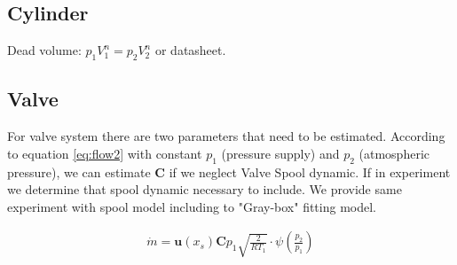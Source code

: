 \documentclass[class=article, crop=false]{standalone}
\begin{document}
\subsection{Cylinder}
Dead volume: $p_1 V_1^n = p_2 V_2^n$ or datasheet.

\subsection{Valve}
For valve system there are two parameters that need to be estimated.
According to equation \ref{eq:flow2} with constant $p_1$ (pressure supply) and $p_2$
(atmospheric pressure), we can estimate $\boldsymbol{C}$ if we neglect Valve Spool dynamic.
If in experiment we determine that spool dynamic necessary to include. We
provide same experiment with spool model including to "Gray-box" fitting
model.

\begin{align}
    \dot{m} = \boldsymbol{u}(x_s) \boldsymbol{C}  p_1 \sqrt{\frac{2}{RT_1}}
    \cdot \psi\left(\frac{p_2}{p_1}\right)
    \label{eq:flow2}
\end{align}
\end{document}
